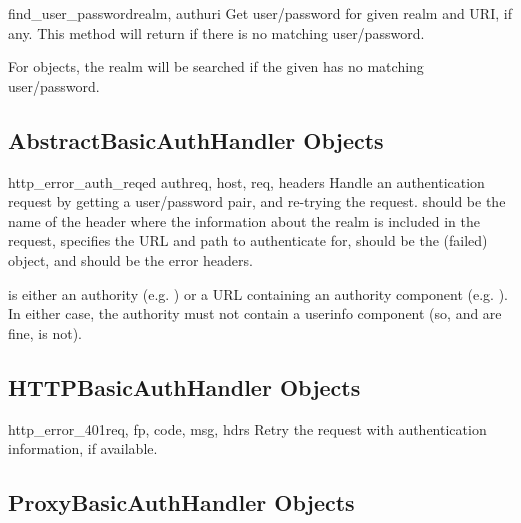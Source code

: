 \begin{methoddesc}[HTTPPasswordMgr]{find_user_password}{realm, authuri}
Get user/password for given realm and URI, if any.  This method will
return  if there is no matching user/password.

For  objects, the realm
 will be searched if the given  has no matching
user/password.
\end{methoddesc}


\subsection{AbstractBasicAuthHandler Objects
            \label{abstract-basic-auth-handler}}

\begin{methoddesc}[AbstractBasicAuthHandler]{http_error_auth_reqed}
                                            {authreq, host, req, headers}
Handle an authentication request by getting a user/password pair, and
re-trying the request.   should be the name of the header
where the information about the realm is included in the request,
 specifies the URL and path to authenticate for, 
should be the (failed)  object, and 
should be the error headers.

 is either an authority (e.g. ) or a URL
containing an authority component (e.g. ).
In either case, the authority must not contain a userinfo component
(so,  and  are fine,
 is not).
\end{methoddesc}


\subsection{HTTPBasicAuthHandler Objects
            \label{http-basic-auth-handler}}

\begin{methoddesc}[HTTPBasicAuthHandler]{http_error_401}{req, fp, code, 
                                                        msg, hdrs}
Retry the request with authentication information, if available.
\end{methoddesc}


\subsection{ProxyBasicAuthHandler Objects
            \label{proxy-basic-auth-handler}}

